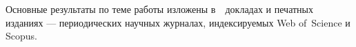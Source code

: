 {\begin{refsection}
        {\publications} Основные результаты по теме работы изложены в~~докладах и печатных изданиях --- периодических научных журналах, индексируемых Web of~Science и Scopus.
        
    \end{refsection}%
    \begin{refsection}
        \nocite{ysip}
        \nocite{gtc}
    \end{refsection}%
}

